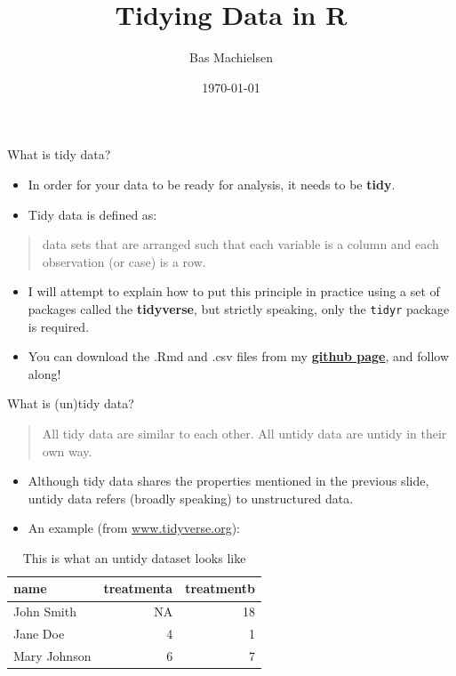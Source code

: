 \documentclass[10pt,ignorenonframetext,]{beamer}
\title{Tidying Data in R}
\author{Bas Machielsen}
\institute{Utrecht University}
\date{\today}
\begin{document}
\frame{\titlepage}

\begin{frame}[fragile]{What is tidy data?}
\protect\hypertarget{what-is-tidy-data}{}

\begin{itemize}
\item
  In order for your data to be ready for analysis, it needs to be
  \textbf{tidy}.
\item
  Tidy data is defined as:
\end{itemize}

\begin{quote}
data sets that are arranged such that each variable is a column and each
observation (or case) is a row.
\end{quote}

\begin{itemize}
\item
  I will attempt to explain how to put this principle in practice using
  a set of packages called the \textbf{tidyverse}, but strictly
  speaking, only the \texttt{tidyr} package is required.
\item
  You can download the .Rmd and .csv files from my
  \href{www.github.com/basm92}{\textbf{github page}}, and follow along!
\end{itemize}

\end{frame}

\begin{frame}{What is (un)tidy data?}
\protect\hypertarget{what-is-untidy-data}{}

\begin{quote}
All tidy data are similar to each other. All untidy data are untidy in
their own way.
\end{quote}

\begin{itemize}
\item
  Although tidy data shares the properties mentioned in the previous
  slide, untidy data refers (broadly speaking) to unstructured data.
\item
  An example (from \url{www.tidyverse.org}):
\end{itemize}

\begin{table}

\caption{\label{tab:unnamed-chunk-1}This is what an untidy dataset looks like}
\centering
\begin{tabular}[t]{lrr}
\toprule
name & treatmenta & treatmentb\\
\midrule
\rowcolor{gray!6}  John Smith & NA & 18\\
Jane Doe & 4 & 1\\
\rowcolor{gray!6}  Mary Johnson & 6 & 7\\
\bottomrule
\end{tabular}
\end{table}

\end{frame}
\end{document}
